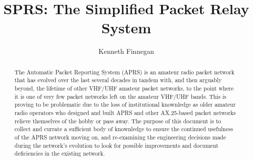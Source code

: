 \documentclass{report}
\begin{document}
\title{SPRS: The Simplified Packet Relay System}
\author{Kenneth Finnegan}
\maketitle

\begin{abstract}
The Automatic Packet Reporting System (APRS) is an amateur radio packet 
network that has evolved over the last several decades in tandem with, 
and then arguably beyond, the lifetime of other VHF/UHF amateur packet
networks, to the point where it is one of very few packet networks left
on the amateur VHF/UHF bands. This is proving to be problematic due to
the loss of institutional knownledge as older amateur radio operators who
designed and built APRS and other AX.25-based packet networks relieve 
themselves of the hobby or pass away. The purpose of this document is to 
collect and currate a sufficient body of knownledge to ensure the 
continued usefulness of the APRS network moving on, and re-examining 
the engineering decisions made during the network's evolution to look for
possible improvements and document deficiencies in the existing network.
\end{abstract}

\tableofcontents






\end{document}
